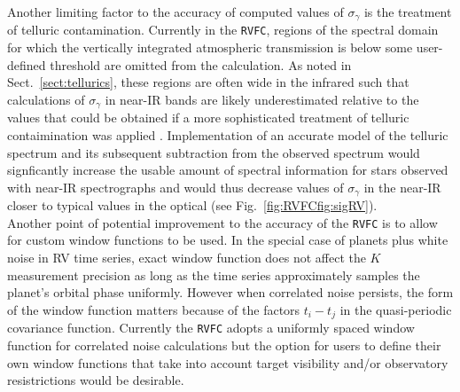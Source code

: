 Another limiting factor to the accuracy of computed values of $\sigma_{\gamma}$
is the treatment of telluric contamination. Currently in the \texttt{RVFC},
regions of the spectral domain for which the vertically integrated atmospheric
transmission is below some user-defined threshold are omitted from the
calculation. As noted in Sect.~\ref{sect:tellurics}, these regions are often
wide in the infrared such that calculations of $\sigma_{\gamma}$ in near-IR
bands are likely underestimated relative to the values that could be obtained
if a more sophisticated treatment of telluric contaimination was applied
\citep[e.g.][]{artigau14,bedell19}. Implementation of an accurate model of the
telluric spectrum and its subsequent subtraction from the observed spectrum
would signficantly increase the usable amount of spectral information for stars
observed with near-IR spectrographs and would thus decrease values of
$\sigma_{\gamma}$ in the near-IR closer to typical values in the optical (see
Fig.~\ref{fig:RVFCfig:sigRV}). \\

Another point of potential improvement to the accuracy of the \texttt{RVFC} is
to allow for custom window functions to be used. In the special case of planets
plus white noise in RV time series, exact window function does not affect the
$K$ measurement precision \sigK{} as long as the time series approximately
samples the planet's orbital phase uniformly. However when correlated noise
persists, the form of the window function matters because of the factors
$t_i-t_j$ in the quasi-periodic covariance function. Currently the \texttt{RVFC}
adopts a uniformly spaced window function for correlated noise calculations but
the option for users to define their own window functions that take into account
target visibility and/or observatory resistrictions would be desirable.


